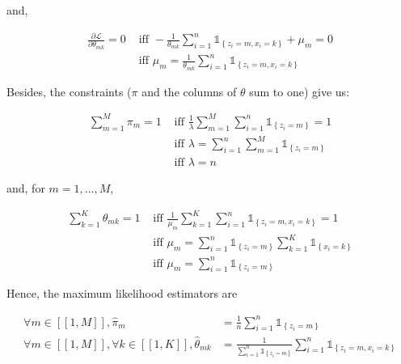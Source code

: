 \documentclass[a4paper, 11pt]{article}
\begin{document}
and,

\begin{equation*}
    \begin{aligned}
    \frac{\partial \mathcal{L}}{\partial \theta_{mk}} = 0 &\text{ iff } - \frac{1}{\theta_{mk}} \sum_{i=1}^{n} \mathds{1}_{\left\{ z_i = m, x_i = k \right\}} + \mu_{m} = 0 \\
    &\text{ iff } \mu_{m} = \frac{1}{\theta_{mk}} \sum_{i=1}^{n} \mathds{1}_{\left\{ z_i = m, x_i = k \right\}}
    \end{aligned}
\end{equation*}

Besides, the constraints ($\pi$ and the columns of $\theta$ sum to one) give us:

\begin{equation*}
    \begin{aligned}
    \sum_{m=1}^{M} \pi_{m} = 1 &\text{ iff } \frac{1}{\lambda} \sum_{m=1}^{M} \sum_{i=1}^{n} \mathds{1}_{\left\{ z_i = m \right\}} = 1 \\
    &\text{ iff } \lambda = \sum_{i=1}^{n} \sum_{m=1}^{M} \mathds{1}_{\left\{ z_i = m \right\}} \\
    &\text{ iff } \lambda = n
    \end{aligned}
\end{equation*}

and, for $m = 1, \dots, M$,

\begin{equation*}
    \begin{aligned}
    \sum_{k=1}^{K} \theta_{mk} = 1 &\text{ iff } \frac{1}{\mu_{m}} \sum_{k=1}^{K} \sum_{i=1}^{n} \mathds{1}_{\left\{ z_i = m, x_i = k \right\}} = 1 \\
    &\text{ iff } \mu_{m} = \sum_{i=1}^{n} \mathds{1}_{\left\{ z_i = m \right\}} \sum_{k=1}^{K} \mathds{1}_{\left\{ x_i = k \right\}} \\
    &\text{ iff } \mu_{m} = \sum_{i=1}^{n} \mathds{1}_{\left\{ z_i = m \right\}}
    \end{aligned}
\end{equation*}

Hence, the maximum likelihood estimators are 

\begin{equation*}
    \boxed{\begin{aligned}
    \forall m \in [\![ 1, M ]\!], \widehat{\pi}_m &= \frac{1}{n} \sum_{i=1}^{n} \mathds{1}_{\left\{ z_i = m \right\}} \\
    \forall m \in [\![ 1, M ]\!], \forall k \in [\![ 1, K ]\!], \widehat{\theta}_{mk} &= \frac{1}{\sum_{i=1}^{n} \mathds{1}_{\left\{ z_i = m \right\}}} \sum_{i=1}^{n} \mathds{1}_{\left\{ z_i = m, x_i = k \right\}} \end{aligned}}
\end{equation*}
\end{document}

